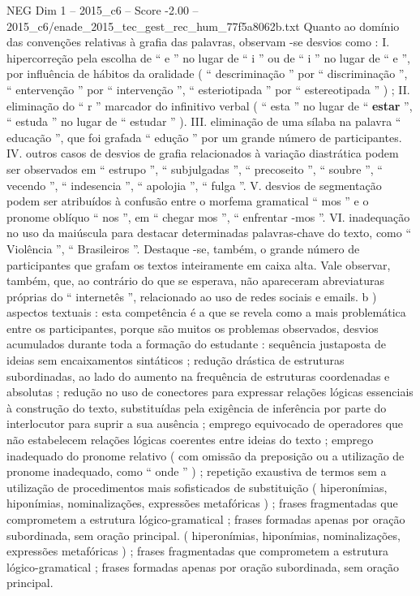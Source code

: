 \begin{textsample}{NEG Dim 1 – 2015\_c6 – Score -2.00 – 2015\_c6/enade\_2015\_tec\_gest\_rec\_hum\_77f5a8062b.txt}
Quanto ao domínio das convenções relativas à grafia das palavras, observam -se desvios como : I. hipercorreção pela escolha de “ e ” no lugar de “ i ” ou de “ i ” no lugar de “ e ”, por influência de hábitos da oralidade ( “ descriminação ” por “ discriminação ”, “ entervenção ” por “ intervenção ”, “ esteriotipada ” por “ estereotipada ” ) ; II. eliminação do “ r ” marcador do infinitivo verbal ( “ esta ” no lugar de “ \textbf{estar} ”, “ estuda ” no lugar de “ estudar ” ).
III. eliminação de uma sílaba na palavra “ educação ”, que foi grafada “ edução ” por um grande número de participantes.
IV. outros casos de desvios de grafia relacionados à variação diastrática podem ser observados em “ estrupo ”, “ subjulgadas ”, “ precoseito ”, “ soubre ”, “ vecendo ”, “ indesencia ”, “ apolojia ”, “ fulga ”.
V. desvios de segmentação podem ser atribuídos à confusão entre o morfema gramatical “ mos ” e o pronome oblíquo “ nos ”, em “ chegar mos ”, “ enfrentar -mos ”.
VI. inadequação no uso da maiúscula para destacar determinadas palavras-chave do texto, como “ Violência ”, “ Brasileiros ”.
Destaque -se, também, o grande número de participantes que grafam os textos inteiramente em caixa alta.
Vale observar, também, que, ao contrário do que se esperava, não apareceram abreviaturas próprias do “ internetês ”, relacionado ao uso de redes sociais e emails. b ) aspectos textuais : esta competência é a que se revela como a mais problemática entre os participantes, porque são muitos os problemas observados, desvios acumulados durante toda a formação do estudante : sequência justaposta de ideias sem encaixamentos sintáticos ; redução drástica de estruturas subordinadas, ao lado do aumento na frequência de estruturas coordenadas e absolutas ; redução no uso de conectores para expressar relações lógicas essenciais à construção do texto, substituídas pela exigência de inferência por parte do interlocutor para suprir a sua ausência ; emprego equivocado de operadores que não estabelecem relações lógicas coerentes entre ideias do texto ; emprego inadequado do pronome relativo ( com omissão da preposição ou a utilização de pronome inadequado, como “ onde ” ) ; repetição exaustiva de termos sem a utilização de procedimentos mais sofisticados de substituição ( hiperonímias, hiponímias, nominalizações, expressões metafóricas ) ; frases fragmentadas que comprometem a estrutura lógico-gramatical ; frases formadas apenas por oração subordinada, sem oração principal. ( hiperonímias, hiponímias, nominalizações, expressões metafóricas ) ; frases fragmentadas que comprometem a estrutura lógico-gramatical ; frases formadas apenas por oração subordinada, sem oração principal.

\end{textsample}

